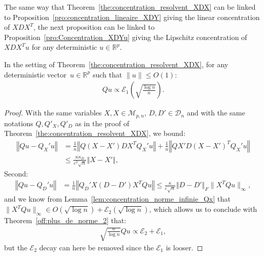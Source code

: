 \documentclass[a4papaer, titlepage]{book}
\begin{document}
 The same way that Theorem~\ref{the:concentration_resolvent_XDX} can be linked to Proposition~\ref{pro:concentration_lineaire_XDY} giving the linear concentration of $XDX^T$, the next proposition can be linked to Proposition~\ref{pro:Concentration_XDYu} giving the Lipschitz concentration of $XDX^Tu$ for any deterministic $u \in \mathbb R^p$. 
\begin{proposition}\label{pro:concentration_uQ}
  In the setting of Theorem~\ref{the:concentration_resolvent_XDX}, for any deterministic vector~$u\in \mathbb R^p$ such that $\|u\|\leq O(1)$:
  \begin{align*}
    Qu \propto \mathcal E_1 \left(\sqrt{\frac{\log n}{n}}\right).
  \end{align*}
\end{proposition}
\begin{proof}
    With the same variables $X,X \in \mathcal M_{p,n}$, $D,D' \in \mathcal D_n$ and with the same notations $Q,Q'_X,Q'_D$ as in the proof of Theorem~\ref{the:concentration_resolvent_XDX}, we bound:
  \begin{align*}
    \left\Vert Qu - Q_X'u\right\Vert 
    &= \frac{1}{ n}\left\Vert Q (X-X') DX^TQ_X'u\right\Vert + \frac{1}{ n}\left\Vert Q X' D(X-X')^TQ_X'u\right\Vert\\
    &\leq \frac{\kappa \kappa_D}{ \varepsilon^2\sqrt n}\left\Vert X-X'\right\Vert,
  \end{align*}
  Second:
  \begin{align*}
    \left\Vert Qu - Q_D'u\right\Vert 
    &= \frac{1}{ n}\left\Vert Q_D' X (D-D')X^TQu\right\Vert
    \leq \frac{\kappa }{ \varepsilon \sqrt n}\left\Vert D-D'\right\Vert_F \|X^TQu \| _\infty,
  \end{align*}
  and we know from Lemma~\ref{lem:concentration_norme_infinie_Qx} that $\|X^TQu \| _\infty \in O(\sqrt{\log n}) + \mathcal E_2(\sqrt{\log n})$, which allows us to conclude with Theorem~\ref{off:plus_de_norme_2} that:
  \begin{align*}
    \sqrt{\frac{n}{\log n}} Qu \propto \mathcal E_2 + \mathcal E_1 ,
  \end{align*}
  but the $\mathcal E_2$ decay can here be removed since the $\mathcal E_1$ is looser.  
\end{proof}


% 
%   
\end{document}

